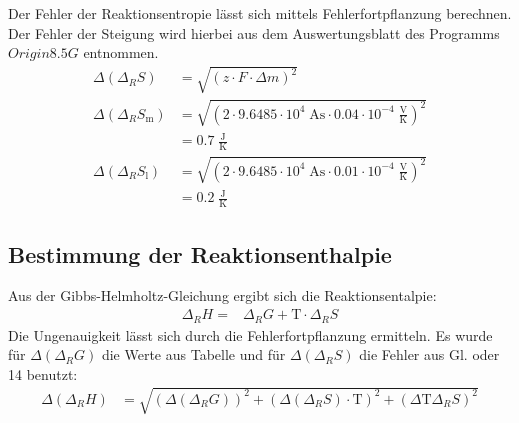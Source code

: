 \documentclass[12pt,a4paper,titlepage,headinclude,bibtotoc]{scrartcl}
\begin{document}
Der Fehler der Reaktionsentropie lässt sich mittels Fehlerfortpflanzung berechnen. Der Fehler der Steigung wird hierbei aus dem Auswertungsblatt des Programms $Origin 8.5 G$ entnommen. 
\begin{align}
\Delta(\Delta_R  S)&= \sqrt{(z\cdot F \cdot \Delta m)^2}\\
\Delta(\Delta_R  S_{\text{m}})&= \sqrt{(2\cdot 9.6485 \cdot 10^4\;\text{As} \cdot 0.04 \cdot 10^{-4}\;\frac{\text{V}}{\text{K}})^2}\\
&= 0.7 \;\frac{\text{J}}{\text{K}}\\
\Delta(\Delta_R  S_{\text{l}})&= \sqrt{(2\cdot 9.6485 \cdot 10^4\;\text{As} \cdot 0.01\cdot 10^{-4}\;\frac{\text{V}}{\text{K}})^2}\\
&= 0.2\;\frac{\text{J}}{\text{K}}
\end{align}
\subsection{Bestimmung der Reaktionsenthalpie}
Aus der Gibbs-Helmholtz-Gleichung ergibt sich die Reaktionsentalpie:
\begin{align}
\Delta_R H=& \Delta_R G +\text{T} \cdot \Delta_R S
\end{align}
Die Ungenauigkeit lässt sich durch die Fehlerfortpflanzung ermitteln. Es wurde für $\Delta(\Delta_R G)$ die Werte aus Tabelle und für $\Delta(\Delta_R S)$ die Fehler aus Gl. oder 14 benutzt:
\begin{align}
\Delta(\Delta_R  H)&= \sqrt{(\Delta(\Delta_R G))^2 + (\Delta(\Delta_R S) \cdot \text{T})^2 +(\Delta\text{T} \Delta_R S)^2}\\
\end{align}
\end{document}
